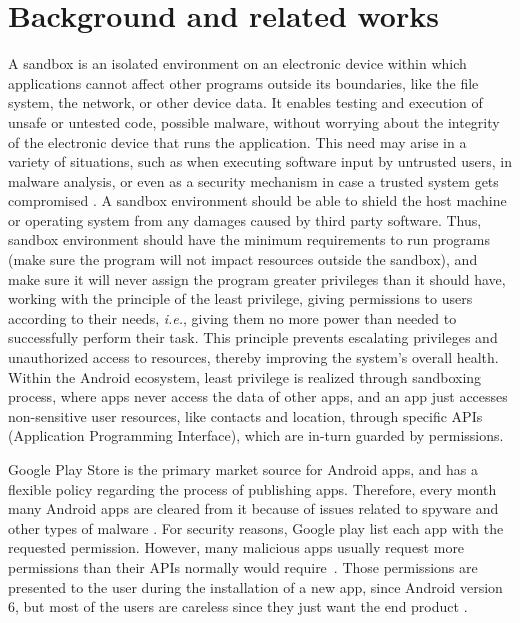 \section{Background and related works}

A sandbox is an isolated environment on an electronic device within which applications cannot affect other programs outside its boundaries, like the file system, the network, or other device data. It enables testing and execution of unsafe or untested code, possible malware, without worrying about the integrity of the electronic device that runs the application. This need may arise in a variety of situations, such as when executing software input by untrusted users, in malware analysis, or even as a security mechanism in case a trusted system gets compromised \cite{DBLP:journals/peerj-cs/MaassSCS16}.
A sandbox environment should be able to shield the host machine or operating system from any damages caused by third party software. Thus, sandbox environment should have the minimum requirements to run programs (make sure the program will not impact resources outside the sandbox), and make sure it will never assign the program greater privileges than it should have, 
working with the principle of the least privilege, giving permissions to users according to their needs, \textit{i.e.}, giving them no more power than needed to successfully perform their task. This principle prevents escalating privileges and unauthorized access to resources, thereby improving the system's overall health. Within the Android ecosystem, least privilege is realized through sandboxing process, where apps never access the data of other apps, and an app just accesses non-sensitive user resources, like contacts and location, through specific APIs (Application Programming Interface), which are in-turn guarded by permissions.

Google Play Store is the primary market source for Android apps, and has a flexible policy regarding the process of publishing apps. Therefore, every month many Android apps are cleared from it because of issues related to spyware and other types of malware \cite{DBLP:conf/msr/WangLL0X18}. For security reasons, Google play list each app with the requested permission. However, many malicious apps usually request more permissions than their APIs normally would require~\cite{DBLP:conf/ccs/FeltCHSW11}. Those permissions are presented to the user during the installation of a new app, since Android version 6, but most of the users are careless since they just want the end product .

